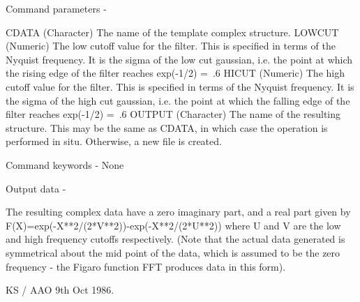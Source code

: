 \begin{description}
\begin{terminalv}
 Command parameters -

 CDATA    (Character) The name of the template complex structure.
 LOWCUT   (Numeric) The low cutoff value for the filter.  This is
          specified in terms of the Nyquist frequency.  It is the
          sigma of the low cut gaussian, i.e. the point at which the
          rising edge of the filter reaches exp(-1/2) =~.6
 HICUT    (Numeric) The high cutoff value for the filter.  This is
          specified in terms of the Nyquist frequency.  It is the
          sigma of the high cut gaussian, i.e. the point at which the
          falling edge of the filter reaches exp(-1/2) =~.6
 OUTPUT   (Character) The name of the resulting structure.  This
          may be the same as CDATA, in which case the operation
          is performed in situ.  Otherwise, a new file is created.

 Command keywords - None

 Output data -

 The resulting complex data have a zero imaginary part, and a real
 part given by F(X)=exp(-X**2/(2*V**2))-exp(-X**2/(2*U**2))
 where U and V are the low and high frequency cutoffs respectively.
 (Note that the actual data generated is symmetrical about the
 mid point of the data, which is assumed to be the zero frequency
 - the Figaro function FFT produces data in this form).

                                     KS / AAO  9th Oct 1986.
\end{terminalv}
\end{description}
